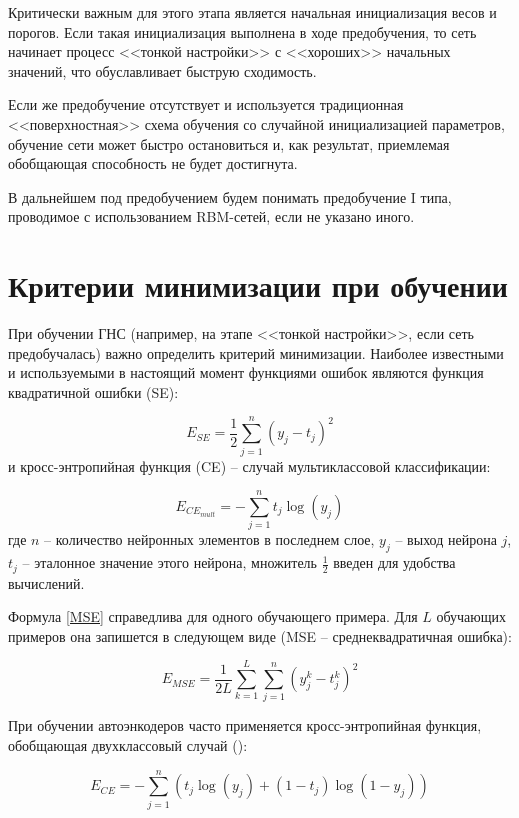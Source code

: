 Критически важным для этого этапа является начальная инициализация весов и порогов. Если такая инициализация выполнена в ходе предобучения, то сеть начинает процесс <<тонкой настройки>> с <<хороших>> начальных значений, что обуславливает быструю сходимость.

Если же предобучение отсутствует и используется традиционная <<поверхностная>> схема обучения со случайной инициализацией параметров, обучение сети может быстро остановиться и, как результат, приемлемая обобщающая способность не будет достигнута.

В дальнейшем под предобучением будем понимать предобучение I типа, проводимое с использованием RBM-сетей, если не указано иного. 

\section{Критерии минимизации при обучении}

При обучении ГНС (например, на этапе <<тонкой настройки>>, если сеть предобучалась) важно определить критерий минимизации. Наиболее известными и используемыми в настоящий момент функциями ошибок являются функция квадратичной ошибки (SE):

\begin{equation}
	\label{MSE}
	E_{SE} = \frac{1}{2}\sum_{j=1}^{n}(y_j - t_j)^2
\end{equation}
и кросс-энтропийная функция (CE) -- случай мультиклассовой классификации:

\begin{equation}
	\label{CE_multiclass}
	E_{CE_{mult}} = -\sum_{j=1}^{n}t_j\log(y_j)
\end{equation}
где $n$ -- количество нейронных элементов в последнем слое, $y_j$ -- выход нейрона $j$, $t_j$ -- эталонное значение этого нейрона, множитель $\frac{1}{2}$ введен для удобства вычислений.

Формула \ref{MSE} справедлива для одного обучающего примера. Для $L$ обучающих примеров она запишется в следующем виде (MSE -- среднеквадратичная ошибка):

\begin{equation}
	\label{MSE_L}
	E_{MSE} = \frac{1}{2L}\sum_{k=1}^{L}\sum_{j=1}^{n}(y_j^k - t_j^k)^2	
\end{equation}

При обучении автоэнкодеров часто применяется кросс-энтропийная функция, обобщающая двухклассовый случай (\cite{Amaral2013}):

\begin{equation}
	\label{CE}
	E_{CE} = -\sum_{j=1}^n(t_j\log(y_j) + (1-t_j)\log(1-y_j))
\end{equation}

